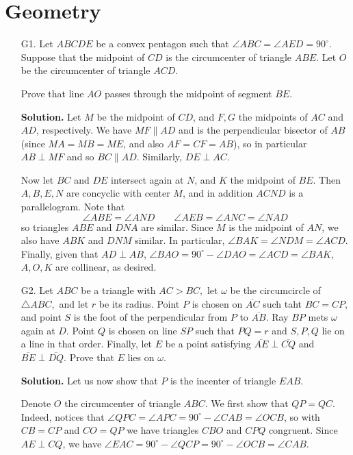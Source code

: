 \documentclass[11pt,a4paper]{article}
\begin{document}
    \section*{Geometry}
    \begin{enumerate}
    	\item [G1.]
    	Let $ABCDE$ be a convex pentagon such that $\angle ABC = \angle AED = 90^\circ$. Suppose that the midpoint of $CD$ is the circumcenter of triangle $ABE$. Let $O$ be the circumcenter of triangle $ACD$.
    	
    	Prove that line $AO$ passes through the midpoint of segment $BE$.
    	
    	\textbf{Solution.}
    	Let $M$ be the midpoint of $CD$, 
    	and $F, G$ the midpoints of $AC$ and $AD$, respectively. 
    	We have $MF\parallel AD$ and is the perpendicular bisector of $AB$ (since $MA=MB=ME$, and also $AF=CF=AB$), 
    	so in particular $AB\perp MF$ and so $BC\parallel AD$. 
    	Similarly, $DE\perp AC$. 
    	
    	Now let $BC$ and $DE$ intersect again at $N$, 
    	and $K$ the midpoint of $BE$. 
    	Then $A, B, E, N$ are concyclic with center $M$, 
    	and in addition $ACND$ is a parallelogram. 
    	Note that 
    	\[
    	\angle ABE = \angle AND
    	\qquad 
    	\angle AEB = \angle ANC = \angle NAD
    	\]
    	so triangles $ABE$ and $DNA$ are similar. 
    	Since $M$ is the midpoint of $AN$, we also have 
    	$ABK$ and $DNM$ similar. 
    	In particular, $\angle BAK = \angle NDM=\angle ACD$. 
    	Finally, given that $AD\perp AB$, 
    	$\angle BAO = 90^{\circ} - \angle DAO = \angle ACD = \angle BAK$, 
    	$A, O, K$ are collinear, as desired. 
    	
    	\item [G2.] 
    	Let $ABC$ be a triangle with $AC > BC,$ let $\omega$ be the circumcircle of $\triangle ABC,$ and let $r$ be its radius. Point $P$ is chosen on $\overline{AC}$ such taht $BC=CP,$ and point $S$ is the foot of the perpendicular from $P$ to $\overline{AB}$. Ray $BP$ mets $\omega$ again at $D$. Point $Q$ is chosen on line $SP$ such that $PQ = r$ and $S,P,Q$ lie on a line in that order. Finally, let $E$ be a point satisfying $\overline{AE} \perp \overline{CQ}$ and $\overline{BE} \perp \overline{DQ}$. Prove that $E$ lies on $\omega$.
    	
    	\textbf{Solution.}
    	Let us now show that $P$ is the incenter of triangle $EAB$. 
    	
    	Denote $O$ the circumcenter of triangle $ABC$. 
    	We first show that $QP=QC$. 
    	Indeed, notices that 
    	$\angle QPC = \angle APC = 90^{\circ} - \angle CAB 
    	= \angle OCB$, so with $CB = CP$ and $CO = QP$ we have triangles $CBO$ and $CPQ$ congruent.
    	Since $AE\perp CQ$, we have 
    	$\angle EAC = 90^{\circ} - \angle QCP = 90^{\circ} - \angle OCB = \angle CAB$. 
    	

\end{enumerate}
\end{document}
